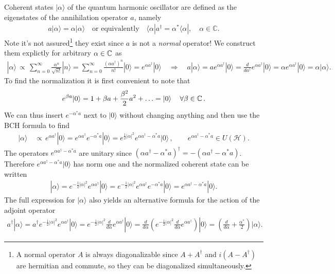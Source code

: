 \documentclass[../QFT_main.tex]{subfiles}
\begin{document}
\begin{mytheorem}
%
Coherent states $|\alpha\rangle$ of the quantum harmonic oscillator are defined as the eigenstates of the annihilation operator $a$, namely
\begin{align}
    a |\alpha\rangle = \alpha |\alpha\rangle \quad\text{or equivalently}\quad \langle \alpha|a^\dagger = \alpha^* \langle \alpha|, \quad \alpha \in \mathbb{C}.
\end{align}
Note it's not assured\footnote{A normal operator $A$ is always diagonalizable since $A+A^\dagger$ and $i(A-A^\dagger)$ are hermitian and commute, so they can be diagonalized simultaneously.} they exist since $a$ is not a \emph{normal} operator!
We construct them explictly for arbitrary $\alpha\in \mathbb{C}$ as
{\small\begin{align}
    |\alpha\rangle \,\propto \, \sum_{n=0}^\infty \frac{\alpha^n}{\sqrt{n!}} |n\rangle = \sum_{n=0}^\infty \frac{(\alpha a^\dagger)^n}{n!} |0\rangle
    = e^{\alpha a^\dagger} |0\rangle\quad \Rightarrow\quad a|\alpha\rangle = a e^{\alpha a^\dagger} |0\rangle = \frac{d}{da^\dagger} e^{\alpha a^\dagger} |0\rangle = \alpha e^{\alpha a^\dagger} |0\rangle = \alpha |\alpha\rangle.
\end{align}}
To find the normalization it is first convenient to note that
{\small\begin{align} 
    e^{\beta a}|0\rangle = 1+\beta a + \frac{\beta^2}{2} a^2 + \ldots = |0\rangle\, \quad \forall \beta \in \mathbb{C}\,.
\end{align}}
We can thus insert $e^{-\alpha^*a}$ next to $|0\rangle$ without changing anything and then use the BCH formula to find 
\begin{align}\label{eq:disentangle_scattering_operator_coherent_states}
    |\alpha\rangle &\,\propto\, e^{\alpha a^\dagger} |0\rangle = e^{\alpha a^\dagger} e^{-\alpha^* a} |0\rangle
    = e^{\frac{1}{2} |\alpha|^2} e^{\alpha a^\dagger - \alpha^* a} |0\rangle\,,\qquad e^{\alpha a^\dagger - \alpha^* a}\in U(\mathcal{H}).
\end{align}
The operators $e^{\alpha a^\dagger - \alpha^* a}$ are unitary since $(\alpha a^\dagger - \alpha^* a)^\dagger = -(\alpha a^\dagger - \alpha^* a)$.
Therefore $e^{\alpha a^\dagger - \alpha^* a} |0\rangle$ has norm one and the normalized coherent state can be written
\begin{align}
    |\alpha\rangle = e^{-\frac{1}{2} |\alpha|^2} e^{\alpha a^\dagger}|0\rangle =  e^{-\frac{1}{2} |\alpha|^2} e^{\alpha a^\dagger}e^{-\alpha^* a}|0\rangle = e^{\alpha a^\dagger - \alpha^* a} |0\rangle.
\end{align}
The full expression for $|\alpha\rangle$ also yields an alternative formula for the action of the adjoint operator
{\small\begin{align}
    a^\dagger |\alpha\rangle = a^\dagger e^{-\tfrac{1}{2}|\alpha|^2}e^{\alpha a^\dagger} |0\rangle
    = e^{-\tfrac{1}{2}|\alpha|^2} \frac{d}{d\alpha} e^{\alpha a^\dagger} |0\rangle
    = \frac{d}{d\alpha}\left(e^{-\tfrac{1}{2}|\alpha|^2} \frac{d}{d\alpha} e^{\alpha a^\dagger}\right)|0\rangle
    = \left(\frac{d}{d\alpha} + \frac{\alpha^*}{2}\right) |\alpha\rangle.
\end{align}}


\end{mytheorem}
\end{document}
